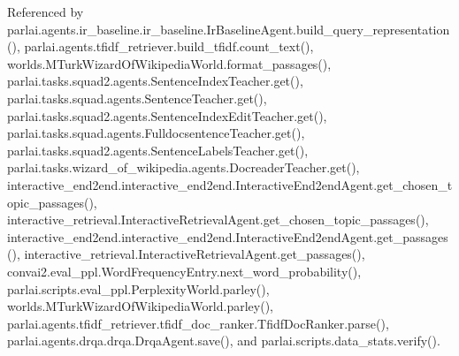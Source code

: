 Referenced by parlai.\+agents.\+ir\+\_\+baseline.\+ir\+\_\+baseline.\+Ir\+Baseline\+Agent.\+build\+\_\+query\+\_\+representation(), parlai.\+agents.\+tfidf\+\_\+retriever.\+build\+\_\+tfidf.\+count\+\_\+text(), worlds.\+M\+Turk\+Wizard\+Of\+Wikipedia\+World.\+format\+\_\+passages(), parlai.\+tasks.\+squad2.\+agents.\+Sentence\+Index\+Teacher.\+get(), parlai.\+tasks.\+squad.\+agents.\+Sentence\+Teacher.\+get(), parlai.\+tasks.\+squad2.\+agents.\+Sentence\+Index\+Edit\+Teacher.\+get(), parlai.\+tasks.\+squad.\+agents.\+Fulldocsentence\+Teacher.\+get(), parlai.\+tasks.\+squad2.\+agents.\+Sentence\+Labels\+Teacher.\+get(), parlai.\+tasks.\+wizard\+\_\+of\+\_\+wikipedia.\+agents.\+Docreader\+Teacher.\+get(), interactive\+\_\+end2end.\+interactive\+\_\+end2end.\+Interactive\+End2end\+Agent.\+get\+\_\+chosen\+\_\+topic\+\_\+passages(), interactive\+\_\+retrieval.\+Interactive\+Retrieval\+Agent.\+get\+\_\+chosen\+\_\+topic\+\_\+passages(), interactive\+\_\+end2end.\+interactive\+\_\+end2end.\+Interactive\+End2end\+Agent.\+get\+\_\+passages(), interactive\+\_\+retrieval.\+Interactive\+Retrieval\+Agent.\+get\+\_\+passages(), convai2.\+eval\+\_\+ppl.\+Word\+Frequency\+Entry.\+next\+\_\+word\+\_\+probability(), parlai.\+scripts.\+eval\+\_\+ppl.\+Perplexity\+World.\+parley(), worlds.\+M\+Turk\+Wizard\+Of\+Wikipedia\+World.\+parley(), parlai.\+agents.\+tfidf\+\_\+retriever.\+tfidf\+\_\+doc\+\_\+ranker.\+Tfidf\+Doc\+Ranker.\+parse(), parlai.\+agents.\+drqa.\+drqa.\+Drqa\+Agent.\+save(), and parlai.\+scripts.\+data\+\_\+stats.\+verify().

